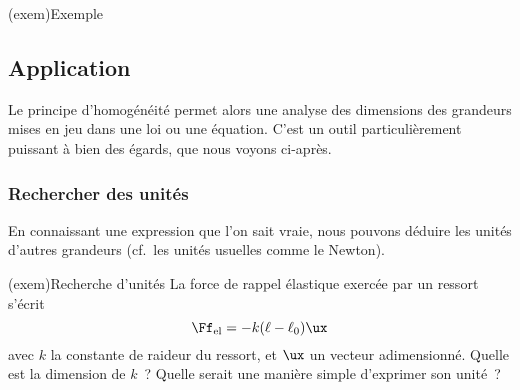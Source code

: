 \documentclass[../main/main.tex]{subfiles}
\begin{document}
\begin{tcb}(exem){Exemple}
	\vspace*{-10pt}
	\vspace*{-10pt}
\end{tcb}

\subsection{Application}

Le principe d'homogénéité permet alors une analyse des dimensions des grandeurs
mises en jeu dans une loi ou une équation. C'est un outil particulièrement
puissant à bien des égards, que nous voyons ci-après.

\subsubsection{Rechercher des unités}

En connaissant une expression que l'on sait vraie, nous pouvons déduire les
unités d'autres grandeurs (cf.\ les unités usuelles comme le Newton).

\begin{tcb}(exem){Recherche d'unités}
	La force de rappel élastique exercée par un ressort s'écrit
	\[\Ff_{\rm el} = -k(\ell-\ell_0)\ux\]
	avec $k$ la constante de raideur du ressort, et $\ux$ un vecteur adimensionné.
	Quelle est la dimension de $k$~? Quelle serait une manière simple d'exprimer
	son unité~?
	\tcblower
	\vspace*{-9pt}
	\begin{isd}
		\tcblower
	\end{isd}
	\vspace*{-20pt}
\end{tcb}
\end{document}
